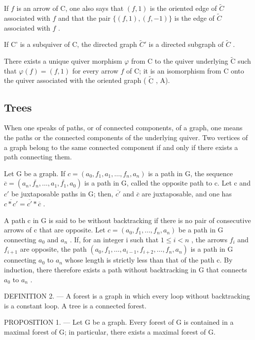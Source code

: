 If \(f\) is an arrow of C, one also says that \((f,1)\) is the oriented edge of \(\widetilde{C}\) associated with \(f\) and that the pair \(\{(f,1),(f,-1)\}\) is the edge of \(\widetilde{C}\) associated with \(f\) .

If C' is a subquiver of C, the directed graph \(\widetilde{C}'\) is a directed subgraph of \(\widetilde{C}\) .

There exists a unique quiver morphism \(\varphi\) from C to the quiver underlying \(\widetilde{\mathrm{C}}\) such that \(\varphi(f) = (f,1)\) for every arrow \(f\) of C; it is an isomorphism from C onto the quiver associated with the oriented graph ( \(\widetilde{\mathrm{C}}\) , A).

\subsection{Trees}

When one speaks of paths, or of connected components, of a graph, one means the paths or the connected components of the underlying quiver. Two vertices of a graph belong to the same connected component if and only if there exists a path connecting them.

Let G be a graph. If \(c = (a_{0}, f_{1}, a_{1}, \ldots, f_{n}, a_{n})\) is a path in G, the sequence \(\overline{c} = (a_{n}, \overline{f_{n}}, \ldots, a_{1}, \overline{f_{1}}, a_{0})\) is a path in G, called the opposite path to c. Let c and \(c'\) be juxtaposable paths in G; then, \(\overline{c'}\) and \(\overline{c}\) are juxtaposable, and one has \(\overline{c * c'} = \overline{c'} * \overline{c}\) .

A path c in G is said to be without backtracking if there is no pair of consecutive arrows of c that are opposite. Let \(c = (a_{0}, f_{1}, \ldots, f_{n}, a_{n})\) be a path in G connecting \(a_{0}\) and \(a_{n}\) . If, for an integer i such that \(1 \leqslant i < n\) , the arrows \(f_{i}\) and \(f_{i+1}\) are opposite, the path \((a_{0}, f_{1}, \ldots, a_{i-1}, f_{i+2}, \ldots, f_{n}, a_{n})\) is a path in G connecting \(a_{0}\) to \(a_{n}\) whose length is strictly less than that of the path c. By induction, there therefore exists a path without backtracking in G that connects \(a_{0}\) to \(a_{n}\) .

DEFINITION 2. --- A forest is a graph in which every loop without backtracking is a constant loop. A tree is a connected forest.

PROPOSITION 1. --- Let G be a graph. Every forest of G is contained in a maximal forest of G; in particular, there exists a maximal forest of G.

